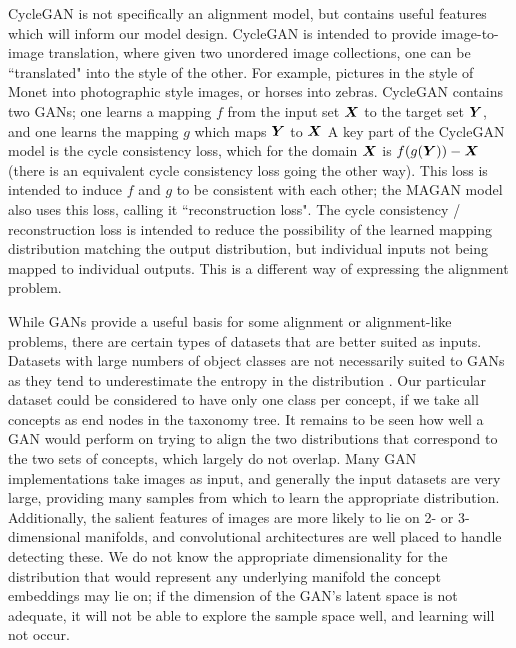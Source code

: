 CycleGAN \cite{CycleGAN} is not specifically an alignment model, but contains useful features which will inform our model design. CycleGAN is intended to provide image-to-image translation, where given two unordered image collections, one can be ``translated" into the style of the other. For example, pictures in the style of Monet into photographic style images, or horses into zebras. CycleGAN contains two GANs; one learns a mapping $f$ from the input set $\boldsymbol{X}$ to the target set $\boldsymbol{Y}$, and one learns the mapping $g$ which maps $\boldsymbol{Y}$ to $\boldsymbol{X}$ A key part of the CycleGAN model is the cycle consistency loss, which for the domain $\boldsymbol{X}$ is $f(g(\boldsymbol{Y})) - \boldsymbol{X}$ (there is an equivalent cycle consistency loss going the other way). This loss is intended to induce $f$ and $g$ to be consistent with each other; the MAGAN model also uses this loss, calling it ``reconstruction loss". The cycle consistency / reconstruction loss is intended to reduce the possibility of the learned mapping distribution matching the output distribution, but individual inputs not being mapped to individual outputs. This is a different way of expressing the alignment problem. 

While GANs provide a useful basis for some alignment or alignment-like problems, there are certain types of datasets that are better suited as inputs. Datasets with large numbers of object classes are not necessarily suited to GANs as they tend to underestimate the entropy in the distribution \cite{ImprovedTechniquesTrainingGANS}. Our particular dataset could be considered to have only one class per concept, if we take all concepts as end nodes in the taxonomy tree. It remains to be seen how well a GAN would perform on trying to align the two distributions that correspond to the two sets of concepts, which largely do not overlap.  Many GAN implementations take images as input, and generally the input datasets are very large, providing many samples from which to learn the appropriate distribution. Additionally, the salient features of images are more likely to lie on 2- or 3-dimensional manifolds, and convolutional architectures are well placed to handle detecting these. We do not know the appropriate dimensionality for the distribution that would represent any underlying manifold the concept embeddings may lie on; if the dimension of the GAN's latent space is not adequate, it will not be able to explore the sample space well, and learning will not occur. 
